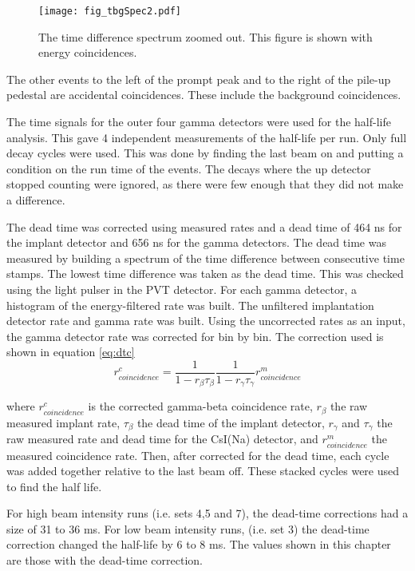 \documentclass[main.tex]{subfiles}
\begin{document}
\begin{figure}
	\centerline{\texttt{[image: fig\_tbgSpec2.pdf]}}	
	\caption{The time difference spectrum zoomed out.
		 This figure is shown with energy coincidences.}
	\label{fig:timediff2}
\end{figure}

The other events to the left of the prompt peak and to the right of the pile-up pedestal are accidental coincidences.
These include the background coincidences.

The time signals for the outer four gamma detectors were used for the half-life analysis.
This gave 4 independent measurements of the half-life per run. 
Only full decay cycles were used. 
This was done by finding the last beam on and putting a condition on the run time of the events.
The decays where the up detector stopped counting were ignored, as there were few enough that they did not make a difference. 

The dead time was corrected using measured rates and a dead time of 464 ns for the implant detector and 656 ns for the gamma detectors.  
The dead time was measured by building a spectrum of the time difference between consecutive time stamps.
The lowest time difference was taken as the dead  time. 
This was checked using the light pulser in the PVT detector.
For each gamma detector, a histogram of the energy-filtered rate was built.
The unfiltered implantation detector rate and gamma rate was built.
Using the uncorrected rates as an input, the gamma detector rate was corrected for bin by bin.
The correction used is shown in equation \ref{eq:dtc}
%
\begin{equation}
r^{c}_{coincidence} = \frac{1}{1 - r_{\beta}\tau_{\beta}}\frac{1}{1 - r_{\gamma}\tau_{\gamma}}r^{m}_{coincidence} 
	\label{eq:dtc} 
\end{equation}
%

where $r^{c}_{coincidence}$ is the corrected gamma-beta coincidence rate, $r_{\beta}$ the raw measured implant rate, $\tau_{\beta}$ the dead time of the implant detector, $r_{\gamma}$ and $\tau_{\gamma}$ the raw measured rate and dead time for the CsI(Na) detector, and $r^{m}_{coincidence}$ the measured coincidence rate.   
Then, after corrected for the dead time, each cycle was added together relative to the last beam off.
These stacked cycles were used to find the half life.

For high beam intensity runs (i.e. sets 4,5 and 7), the dead-time corrections had a size of 31 to 36 ms.
For low beam intensity runs, (i.e. set 3) the dead-time correction changed the half-life by 6 to 8 ms. 
The values shown in this chapter are those with the dead-time correction.
\end{document}
